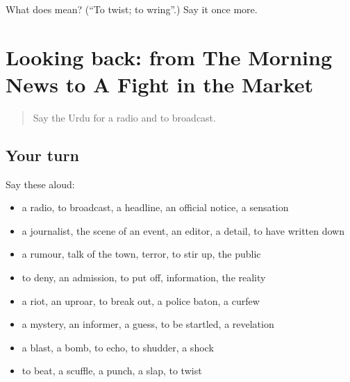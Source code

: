 \begin{tcolorbox}[breakable,colback=teal!4,colframe=teal!35!black,title={Before you move on}]
What does  mean? (\textquotedblleft{}To twist; to wring\textquotedblright{}.) Say it once more.
\end{tcolorbox}
\section[(dialogue)]{Looking back: from The Morning News to A Fight in the Market}

\label{lesson:UR-R307-review-300-307}



\begin{quote}
Say the Urdu for a radio and to broadcast.
\end{quote}

\subsection*{Your turn}
Say these aloud:

\begin{itemize}
\raggedright
  \item a radio, to broadcast, a headline, an official notice, a sensation
  \item a journalist, the scene of an event, an editor, a detail, to have written down
  \item a rumour, talk of the town, terror, to stir up, the public
  \item to deny, an admission, to put off, information, the reality
  \item a riot, an uproar, to break out, a police baton, a curfew
  \item a mystery, an informer, a guess, to be startled, a revelation
  \item a blast, a bomb, to echo, to shudder, a shock
  \item to beat, a scuffle, a punch, a slap, to twist
\end{itemize}

